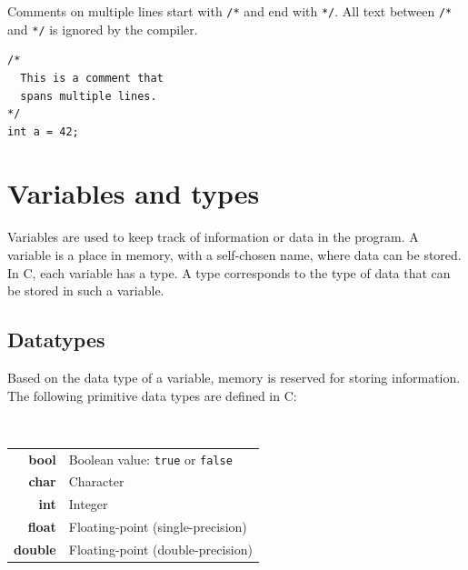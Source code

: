 \documentclass[11pt,fleqn]{book} %
\def\Cpp{{C\nolinebreak[4]\hspace{-.05em}\raisebox{.4ex}{\tiny\bf ++}}}
\begin{document}
\noindent Comments on multiple lines start with \texttt{/*} and end with \texttt{*/}. All text between \texttt{/*} and \texttt{*/} is ignored by the compiler.

\begin{example}
	\phantom{ }
	\begin{verbatim}
/*
  This is a comment that
  spans multiple lines.
*/
int a = 42;
	\end{verbatim}
\end{example}

\chapter{Variables and types}
Variables are used to keep track of information or data in the program. A variable is a place in memory, with a self-chosen name, where data can be stored. In \Cpp{}, each variable has a type. A type corresponds to the type of data that can be stored in such a variable.

\section{Datatypes}
\label{section:datatypes}

Based on the data type of a variable, memory is reserved for storing information. The following primitive data types are defined in \Cpp{}:

\begin{definition}
	\label{definition:primitive-data-types}
	\phantom{ } \\
	\begin{minipage}{\columnwidth}
		\vspace{0.1cm}
		\begin{tabular}{rl}
			\textbf{bool} & Boolean value: \texttt{true} or \texttt{false} \\
			\textbf{char} & Character \\
			\textbf{int} & Integer \\
			\textbf{float} & Floating-point (single-precision) \\
			\textbf{double} & Floating-point (double-precision)
		\end{tabular}
		\vspace{0.1cm}
	\end{minipage}
\end{definition}
\end{document}
